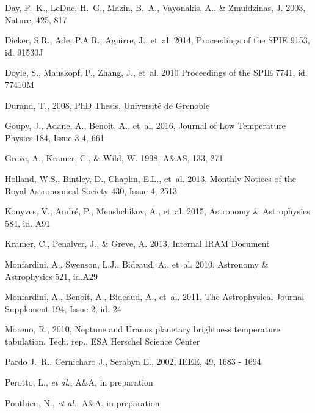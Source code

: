 \begin{thebibliography}{99}
Day, P.~K., LeDuc, H.~G., Mazin, B.~A., Vayonakis, A., \& Zmuidzinas, J. 2003,
Nature, 425, 817

Dicker, S.R., Ade, P.A.R., Aguirre, J., {et~al.} 2014,
Proceedings of the SPIE 9153, id. 91530J 

Doyle, S., Mauskopf, P., Zhang, J., {et~al.} 2010
Proceedings of the SPIE 7741, id. 77410M

Durand, T., 2008, 
PhD Thesis, Universit\' e de Grenoble

Goupy, J., Adane, A., Benoit, A., {et~al.} 2016, 
Journal of Low Temperature Physics 184, Issue 3-4, 661

Greve, A., Kramer, C., \& Wild, W. 1998, 
A\&AS, 133, 271

Holland, W.S., Bintley, D., Chaplin, E.L., {et~al.} 2013, 
Monthly Notices of the Royal Astronomical Society 430, Issue 4, 2513

Konyves, V., Andr\'e, P., Menshchikov, A., {et~al.} 2015, 
Astronomy \& Astrophysics 584, id. A91

Kramer, C., Penalver, J., \& Greve, A. 2013, Internal IRAM Document

Monfardini, A., Swenson, L.J., Bideaud, A., {et~al.} 2010, 
Astronomy \& Astrophysics 521, id.A29

Monfardini, A., Benoit, A., Bideaud, A., {et~al.} 2011, 
The Astrophysical Journal Supplement 194, Issue 2, id. 24
 
Moreno, R., 2010, 
Neptune and Uranus planetary brightness temperature tabulation. Tech. rep., ESA Herschel Science Center

Pardo J.~R., Cernicharo J., Serabyn E., 2002, 
IEEE, 49, 1683 - 1694
    
Perotto, L., {\it et al.}, A\&A, in preparation

Ponthieu, N., {\it et al.}, A\&A, in preparation


\end{thebibliography}
